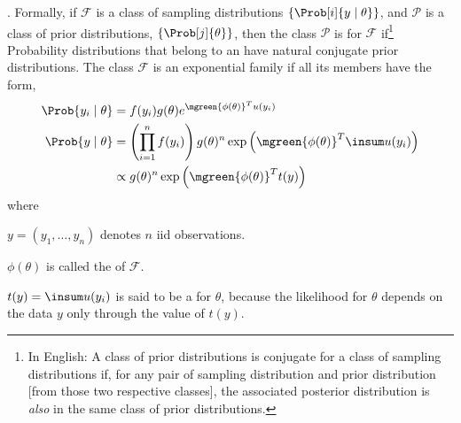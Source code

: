 \documentclass[11pt]{article}
\newcommand\myspace[1][]{\vspace{#1\bigskipamount}}
\newcommand\p{\Needspace{10\baselineskip} \noindent}
\begin{document}
\myspace
\p {}. Formally, if $\mathcal{F}$ is a class of sampling distributions $\{  \Prob[i]{y \mid \theta}  \}$, and $\mathcal{P}$ is a class of prior distributions, $\{  \Prob[j]{\theta} \}$, then the class $\mathcal{P}$ is  for $\mathcal{F}$ if\footnote{In English: A class of prior distributions is conjugate for a class of sampling distributions if, for any pair of sampling distribution and prior distribution [from those two respective classes], the associated posterior distribution is \textit{also} in the same class of prior distributions.}
Probability distributions that belong to an  have natural conjugate prior distributions. The class $\mathcal{F}$ is an exponential family if all its members have the form,
\begin{align}
	\Prob{y_i \mid \theta} &= f(y_i) g(\theta) e^{\mgreen{\phi(\theta)}^T u(y_i)} \\
	\Prob{y \mid \theta} &= \left( \prod_{i=1}^n f(y_i) \right) g(\theta)^n \exp\left(  \mgreen{\phi(\theta)}^T \insum u(y_i) \right) \\
	&\propto g(\theta)^n \exp\left(  \mgreen{\phi(\theta)}^T t(y) \right)
\end{align}
where
\begin{compactitem}
\item $y = (y_1, \ldots, y_n)$ denotes $n$ iid observations.
\item $\phi(\theta)$ is called the  of $\mathcal{F}$. 
\item $t(y) = \insum u(y_i)$ is said to be a  for $\theta$, because the likelihood for $\theta$ depends on the data $y$ only through the value of $t(y)$. 
\end{compactitem}
\end{document}
